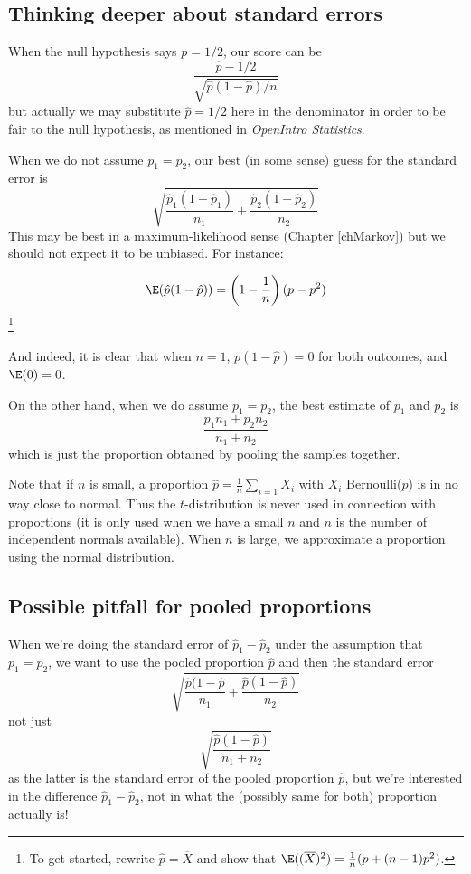 \subsection{Thinking deeper about standard errors}
	When the null hypothesis says $p=1/2$, our score can be
	\[
		\frac{\hat p - 1/2}{\sqrt{\hat p(1-\hat p)/n}}
	\]
	but actually we may substitute $\hat p=1/2$ here in the denominator in order to be fair to the null hypothesis, as mentioned in \emph{OpenIntro Statistics}.

	When we do not assume $p_1=p_2$, our best (in some sense) guess for the standard error is
	\[
		\sqrt{\frac{\hat p_1(1-\hat p_1)}{n_1} + \frac{\hat p_2(1-\hat p_2)}{n_2}}
	\]
	This may be best in a maximum-likelihood sense (Chapter \ref{chMarkov}) but we should not expect it to be unbiased. For instance:
	\begin{exercise}
	\[
		\E(\hat p(1-\hat p)) = \left(1-\frac1n\right)(p-p^2)
	\]\footnote{To get started, rewrite $\hat p=\overline X$ and show that $\E((\overline X)^2) = \frac1n (p+(n-1)p^2)$.}
	\end{exercise}
	And indeed, it is clear that when $n=1$, $p(1-\hat p) = 0$ for both outcomes, and $\E(0)=0$.

	On the other hand, when we do assume $p_1=p_2$, the best estimate of $p_1$ and $p_2$ is
	\[
		\frac{p_1n_1+p_2n_2}{n_1+n_2}
	\]
	which is just the proportion obtained by pooling the samples together. 

	Note that if $n$ is small, a proportion $\hat p  = \frac1n\sum_{i=1}X_i$ with $X_i$ Bernoulli($p$) is in no way close to normal.
	Thus the $t$-distribution is never used in connection with proportions
	(it is only used when we have a small $n$ and $n$ is the number of independent normals available).
	When $n$ is large, we approximate a proportion using the normal distribution.


\subsection{Possible pitfall for pooled proportions}%
When we're doing the standard error of $\hat p_1-\hat p_2$ under the assumption that $p_1=p_2$, we want to use the
pooled proportion $\hat p$ and then the standard error
\[
	\sqrt{\frac{\hat p(1-\hat p}{n_1}+\frac{\hat p(1-\hat p)}{n_2}}
\]
not just
\[
	\sqrt{\frac{\hat p(1-\hat p)}{n_1+n_2}}
\]
as the latter is the standard error of the pooled proportion $\hat p$, but we're interested in the difference $\hat p_1-\hat p_2$, not in what the (possibly same for both) proportion actually is!

